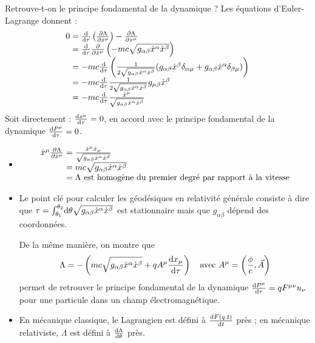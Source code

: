 Retrouve-t-on le principe fondamental de la dynamique ? Les équations d'Euler-Lagrange donnent :
$$
	\begin{array}{r@{\;}l}
		0&=\frac{\dif}{\dif \tau}\left(\frac{\partial\Lambda}{\partial\dot{x}^\mu}\right)-\frac{\partial\Lambda}{\partial x^\mu}\\
			&=\frac{\dif}{\dif\tau}\frac{\partial}{\partial\dot{x}^\mu}\left(-mc\sqrt{g_{\alpha\beta}\dot{x}^{\alpha}\dot{x}^{\beta}}\right)\\
			&=-mc\frac{\dif}{\dif\tau}\left(\frac{1}{2\sqrt{g_{\alpha\beta}\dot{x}^{\alpha}\dot{x}^{\beta}}}( g_{\alpha\beta}\dot{x}^{\beta}\delta_{\alpha\mu}+g_{\alpha\beta}\dot{x}^{\alpha}\delta_{\beta\mu})\right)\\
			&=-mc\frac{\dif}{\dif\tau}\frac{1}{2\sqrt{g_{\alpha\beta}\dot{x}^{\alpha}\dot{x}^{\beta}}}g_{\mu\beta}\dot{x}^{\beta}\\
			&=-mc\frac{\dif}{\dif\tau}\frac{\dot{x}^\mu}{\sqrt{g_{\alpha\beta}\dot{x}^{\alpha}\dot{x}^{\beta}}}
	\end{array}
$$
Soit directement : $\frac{\mathrm{d}\dot{x^\mu}}{\mathrm{d}\tau}=0$, en accord avec le principe fondamental de la dynamique $\frac{\mathrm{d} P^\mu}{\mathrm{d}\tau}=0$.

\begin{remarks}\hspace*{1pt}
	\begin{itemize}
		\item 
		$$
			\begin{array}{r@{\;}l}
				\dot{x}^\mu\frac{\partial\Lambda}{\partial\dot{x}^\mu}&=\frac{\dot{x}^\mu\dot{x}_\mu}{\sqrt{g_{\alpha\beta}\dot{x}^{\alpha}\dot{x}^{\beta}}}\\
					&=mc\sqrt{g_{\alpha\beta}\dot{x}^{\alpha}\dot{x}^{\beta}}\\
					&=\Lambda \text{ est homogène du premier degré par rapport à la vitesse}
			\end{array}
		$$
		\item {\txt Le point clé pour calculer les géodésiques en relativité générale consiste à dire que $\tau=\int_{\theta_1}^{\theta_2}\!\mathrm{d}\theta\sqrt{g_{\alpha\beta}\dot{x}^{\alpha}\dot{x}^{\beta}}$ est stationnaire mais que $g_{\alpha\beta}$ dépend des coordonnées.} 
		\begin{exo}
			{\txt De la m\^eme manière, on montre que
			$$
				\Lambda=-\left(mc\sqrt{g_{\alpha\beta}\dot{x}^{\alpha}\dot{x}^{\beta}}+qA^\mu\frac{\mathrm{d} x_\mu}{\mathrm{d}\tau}\right)\text{\hspace{10pt}avec }A^\mu=\left(\frac{\phi}{c},\vec{A}\right)
			$$
			permet de retrouver le principe fondamental de la dynamique $\frac{\mathrm{d} P^\mu}{\mathrm{d}\tau}=qF^{\mu\nu}u_\nu$ pour une particule dans un champ électromagnétique.}
		\end{exo}
		\item {\txt En mécanique classique, le Lagrangien est défini à $\frac{\mathrm{d} F(q,t)}{\mathrm{d} t}$ près ; en mécanique relativiste, $\Lambda$ est défini à $\frac{\mathrm{d}\Lambda}{\mathrm{d}\theta}$ près.}
	\end{itemize}
\end{remarks}

